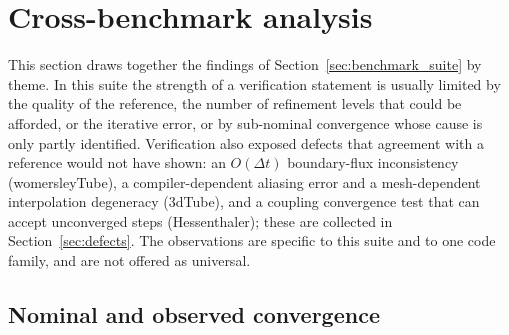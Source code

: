 \section{Cross-benchmark analysis}\label{sec:cross_benchmark}


This section draws together the findings of Section~\ref{sec:benchmark_suite} by theme.
In this suite the strength of a verification statement is usually limited by the quality of the reference, the number of refinement levels that could be afforded, or the iterative error, or by sub-nominal convergence whose cause is only partly identified.
Verification also exposed defects that agreement with a reference would not have shown: an $O(\Delta t)$ boundary-flux inconsistency (womersleyTube), a compiler-dependent aliasing error and a mesh-dependent interpolation degeneracy (3dTube), and a coupling convergence test that can accept unconverged steps (Hessenthaler); these are collected in Section~\ref{sec:defects}.
The observations are specific to this suite and to one code family, and are not offered as universal.

\subsection{Nominal and observed convergence}\label{sec:cross_convergence}

